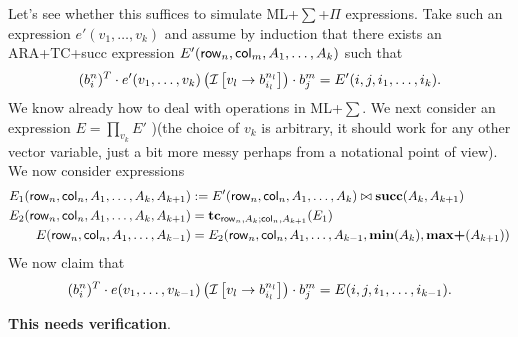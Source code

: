 Let's see whether this suffices to simulate ML+$\sum$+$\Pi$ expressions. Take such an expression $e'(v_1,\ldots,v_k)$ and assume by induction that there exists an ARA+TC+succ expression $E'(\mathsf{row}_n,\mathsf{col}_m,\allowbreak A_1,\ldots,A_k)$ such that 
$$(b_i^n)^T\cdot e'(v_1,\ldots,v_k)\left(\mathcal{I}\left[ v_l\rightarrow b_{i_l}^{n_l}\right]\right)\cdot b_j^m=E'(i,j,i_1,\ldots, i_k).$$
We know already how to deal with operations in ML+$\sum$. We next consider an expression $E=\prod_{v_k} E'$ )(the choice of $v_k$
is arbitrary, it should work for any other vector variable, just a bit more messy perhaps from a notational point of view). We now consider
expressions
\begin{align*}
E_1(\mathsf{row}_n,\mathsf{col}_n,A_1,\ldots,A_k,A_{k+1})&:=E'(\mathsf{row}_n,\mathsf{col}_n,A_1,\ldots,A_k)\bowtie \mathbf{succ}(A_k,A_{k+1})\\
E_2(\mathsf{row}_n,\mathsf{col}_n,A_1,\ldots,A_k,A_{k+1})&=\mathbf{tc}_{\mathsf{row}_n,A_k;\mathsf{col}_n,A_{k+1}}(E_1)\\
E(\mathsf{row}_n,\mathsf{col}_n,A_1,\ldots,A_{k-1})&=E_2(\mathsf{row}_n,\mathsf{col}_n,A_1,\ldots,A_{k-1},\textbf{min}(A_k),\textbf{max+}(A_{k+1}))
\end{align*}
We now claim that 
$$(b_i^n)^T\cdot e(v_1,\ldots,v_{k-1})\left(\mathcal{I}\left[ v_l\rightarrow b_{i_l}^{n_l}\right]\right)\cdot b_j^m=E(i,j,i_1,\ldots, i_{k-1}).$$

{\bf This needs verification}.


